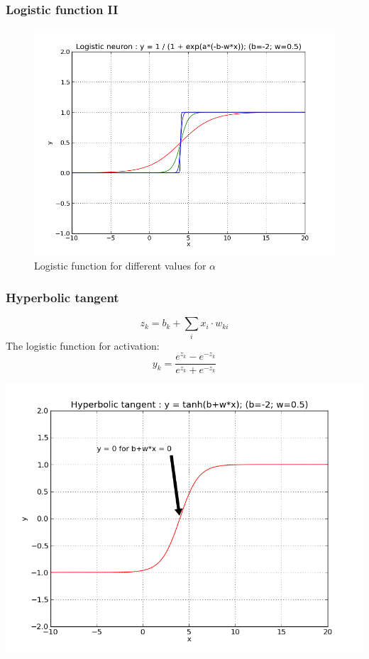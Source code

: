 \begin{frame}
  \frametitle{Logistic function II}
  \begin{figure}[h!]
    \centering
    \includegraphics[height = .7\textheight]{graphics/logistic-neuron-2.png}
    \caption{Logistic function for different values for $\alpha$}
  \end{figure}
\end{frame}

\begin{frame}
  \frametitle{Hyperbolic tangent}
  \begin{definition}
    \begin{equation}
      \label{eq:hyperbolic-neuron-1}
      z_k = b_k + \displaystyle\sum_{i}x_i\cdot w_{ki}
    \end{equation}
    The logistic function for activation:
    \begin{equation}
      \label{eq:hyperbolic-neuron-2}
      y_k = \frac{e^{z_k}-e^{-z_k}}{e^{z_k}+e^{-z_k}}
    \end{equation}
  \end{definition}
  \begin{center}
    \includegraphics[height = .4\textheight]{graphics/hyperbolic_neuron.png}
  \end{center}
\end{frame}


